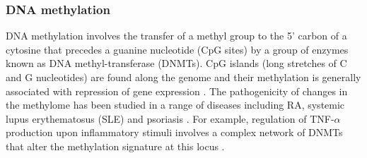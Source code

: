 \subsubsection{DNA methylation}
DNA methylation involves the transfer of a methyl group to the 5' carbon of a cytosine that precedes a guanine nucleotide (CpG sites) by a group of enzymes known as DNA methyl-transferase (DNMTs). CpG islands (long stretches of C and G nucleotides) are found along the genome and their methylation is generally associated with repression of gene expression \parencite{Herman2003}. %
The pathogenicity of changes in the methylome has been studied in a range of diseases including RA, systemic lupus erythematosus (SLE) and psoriasis \parencite{Lei2009,Liu2013,Zhang2010}. For example, regulation of TNF-$\alpha$ production upon inflammatory stimuli involves a complex network of DNMTs that alter the methylation signature at this locus \parencite{Sullivan2007}. %



